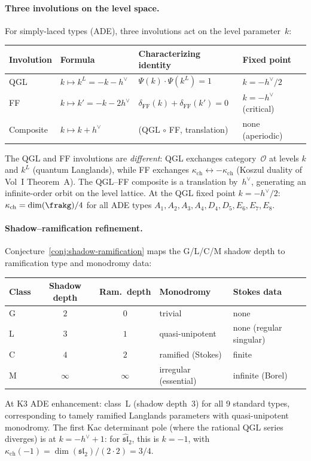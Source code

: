 \paragraph{Three involutions on the level space.}
For simply-laced types (ADE), three involutions act on the level parameter~$k$:
\begin{center}
\renewcommand{\arraystretch}{1.3}
\begin{tabular}{llll}
\toprule
Involution & Formula & Characterizing identity & Fixed point \\
\midrule
QGL & $k \mapsto k^L = -k - h^\vee$ & $\Psi(k) \cdot \Psi(k^L) = 1$ & $k = -h^\vee/2$ \\
FF & $k \mapsto k' = -k - 2h^\vee$ & $\delta_{\mathrm{FF}}(k) + \delta_{\mathrm{FF}}(k') = 0$ & $k = -h^\vee$ (critical) \\
Composite & $k \mapsto k + h^\vee$ & (QGL $\circ$ FF, translation) & none (aperiodic) \\
\bottomrule
\end{tabular}
\end{center}
\noindent The QGL and FF involutions are \emph{different}: QGL exchanges category~$\mathcal{O}$ at levels $k$ and $k^L$ (quantum Langlands), while FF exchanges $\kappa_{\mathrm{ch}} \leftrightarrow -\kappa_{\mathrm{ch}}$ (Koszul duality of Vol~I Theorem~A). The QGL--FF composite is a translation by~$h^\vee$, generating an infinite-order orbit on the level lattice. At the QGL fixed point $k = -h^\vee/2$: $\kappa_{\mathrm{ch}} = \dim(\frakg)/4$ for all ADE types \(A_1, A_2, A_3, A_4, D_4, D_5, E_6, E_7, E_8\).

\paragraph{Shadow--ramification refinement.}
Conjecture~\ref{conj:shadow-ramification} maps the G/L/C/M shadow depth to ramification type and monodromy data:
\begin{center}
\begin{tabular}{lccll}
Class & Shadow depth & Ram.\ depth & Monodromy & Stokes data \\
\hline
G & $2$ & $0$ & trivial & none \\
L & $3$ & $1$ & quasi-unipotent & none (regular singular) \\
C & $4$ & $2$ & ramified (Stokes) & finite \\
M & $\infty$ & $\infty$ & irregular (essential) & infinite (Borel)
\end{tabular}
\end{center}
\noindent At K3 ADE enhancement: class~L (shadow depth~3) for all 9 standard types, corresponding to tamely ramified Langlands parameters with quasi-unipotent monodromy. The first Kac determinant pole (where the rational QGL series diverges) is at $k = -h^\vee + 1$: for $\hat{\mathfrak{sl}}_2$, this is $k = -1$, with $\kappa_{\mathrm{ch}}(-1) = \dim(\mathfrak{sl}_2)/(2 \cdot 2) = 3/4$.

